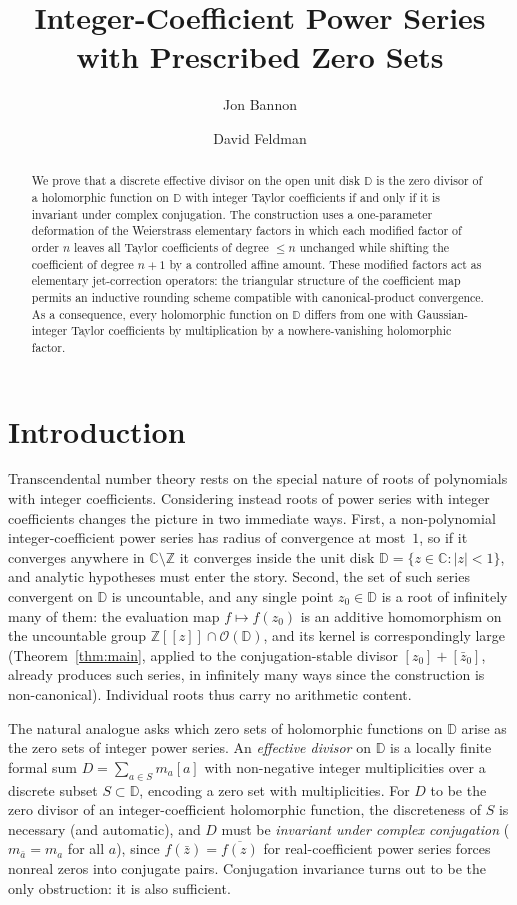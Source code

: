 \documentclass{amsart}
\title{Integer-Coefficient Power Series with Prescribed Zero Sets}
\author{Jon Bannon}
\author{David Feldman}
\date{}
\theoremstyle{definition}
\newcommand{\D}{\mathbb{D}}
\newcommand{\Z}{\mathbb{Z}}
\newcommand{\C}{\mathbb{C}}
\newcommand{\abs}[1]{\left|#1\right|}
\newcommand{\OD}{\mathcal{O}(\D)}
\begin{document}
\begin{abstract}
We prove that a discrete effective divisor on the open unit disk $\D$
is the zero divisor of a holomorphic function on $\D$ with integer
Taylor coefficients if and only if it is invariant under complex
conjugation.  The construction uses a one-parameter deformation of the
Weierstrass elementary factors in which each modified factor of order
$n$ leaves all Taylor coefficients of degree $\leq n$ unchanged while
shifting the coefficient of degree $n+1$ by a controlled affine amount.
These modified factors act as elementary jet-correction operators: the
triangular structure of the coefficient map permits an inductive
rounding scheme compatible with canonical-product convergence.  As a
consequence, every holomorphic function on $\D$ differs from one with
Gaussian-integer Taylor coefficients by multiplication by a
nowhere-vanishing holomorphic factor.
\end{abstract}

\maketitle

\section{Introduction}

Transcendental number theory rests on the special nature of roots of
polynomials with integer coefficients.  Considering instead roots of
power series with integer coefficients changes the picture in two
immediate ways.  First, a non-polynomial integer-coefficient
power series has radius of convergence at most~$1$, so if it converges
anywhere in $\C \setminus \Z$ it converges inside the unit disk $\D =
\{z \in \C : \abs{z} < 1\}$, and analytic hypotheses must enter the
story.  Second, the set of such series convergent on $\D$ is
uncountable, and any single point $z_0 \in \D$ is a root of infinitely
many of them: the evaluation map $f \mapsto f(z_0)$ is an additive
homomorphism on the uncountable group $\Z[[z]] \cap \OD$, and its
kernel is correspondingly large (Theorem~\ref{thm:main}, applied to the
conjugation-stable divisor $[z_0] + [\bar z_0]$, already produces such
series, in infinitely many ways since the construction is
non-canonical).  Individual roots thus carry no arithmetic content.

The natural analogue asks which zero sets of holomorphic functions
on $\D$ arise as the zero sets of integer power series.  An
\emph{effective divisor} on $\D$
is a locally finite formal sum $D = \sum_{a \in S} m_a [a]$ with
non-negative integer multiplicities over a discrete subset $S \subset
\D$, encoding a zero set with multiplicities.  For $D$ to be the zero
divisor of an integer-coefficient holomorphic function, the discreteness
of $S$ is necessary (and automatic), and $D$ must be \emph{invariant
under complex conjugation} ($m_{\bar a} = m_a$ for all $a$), since
$f(\bar z) = \overline{f(z)}$ for real-coefficient power series forces
nonreal zeros into conjugate pairs.  Conjugation invariance turns out
to be the only obstruction: it is also sufficient.
\end{document}
